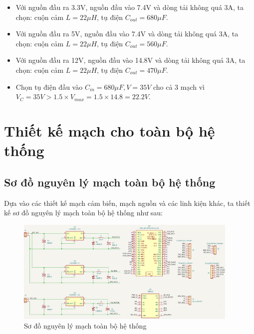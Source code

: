                 \begin{itemize}
                    \item Với nguồn đầu ra 3.3V, nguồn đầu vào 7.4V và dòng tải không quá 3A, ta chọn: cuộn cảm $L = 22 \mu H$, tụ điện $C_{out} = 680 \mu F$. 
                    \item Với nguồn đầu ra 5V, nguồn đầu vào 7.4V và dòng tải không quá 3A, ta chọn: cuộn cảm $L = 22 \mu H$, tụ điện $C_{out} = 560 \mu F$.
                    \item Với nguồn đầu ra 12V, nguồn đầu vào 14.8V và dòng tải không quá 3A, ta chọn: cuộn cảm $L = 22 \mu H$, tụ điện $C_{out} = 470 \mu F$.
                    \item Chọn tụ điện đầu vào $C_{in} = 680 \mu F, V = 35 V$ cho cả 3 mạch vì $V_{C} = 35 V > 1.5 \times V_{max} = 1.5 \times 14.8 = 22.2 V$.
                \end{itemize}
        \section{Thiết kế mạch cho toàn bộ hệ thống}
            \subsection{Sơ đồ nguyên lý mạch toàn bộ hệ thống}
                \hspace*{0.6cm}Dựa vào các thiết kế mạch cảm biến, mạch nguồn và các linh kiện khác, ta thiết kế sơ đồ nguyên lý mạch toàn bộ hệ thống như sau:
                \begin{figure}[H]
                    \centering
                    \includegraphics[width=0.95\textwidth]{pictures/chapter4/c4_p14_Schematic.png}
                    \caption{Sơ đồ nguyên lý mạch toàn bộ hệ thống}
                    \label{fig:4-17}
                \end{figure}
